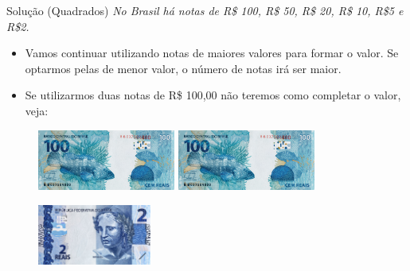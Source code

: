 \documentclass{beamer}
\begin{document}
\begin{frame}{Solução (Quadrados)}
\textit{No Brasil há notas de R\$ 100, R\$ 50, R\$ 20, R\$ 10, R\$5 e R\$2.}
\begin{itemize}
    \item Vamos continuar utilizando notas de maiores valores para formar o valor. Se optarmos pelas de menor valor, o número de notas irá ser maior.
    \item Se utilizarmos duas notas de R\$ 100,00 não teremos como completar o valor, veja:
\end{itemize}

\begin{figure}[tb]
\begin{center}
	\includegraphics[height=2cm]{100.jpg} \pause \quad
	\includegraphics[height=2cm]{100.jpg}
\end{center}
\end{figure}

\begin{figure}[tb]
\begin{center}
	\includegraphics[height=2cm]{2.jpg} 
\end{center}
\end{figure}

\end{frame}
\end{document}
